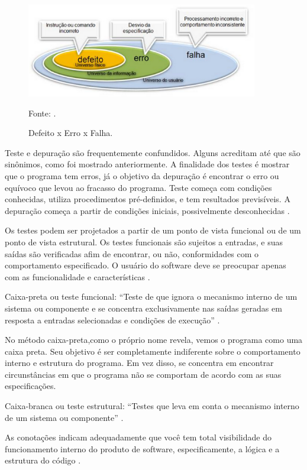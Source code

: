 \begin{figure}[H]
\centering
\includegraphics[width=0.9\textwidth]{figuras/defeitoErroFalha}
\caption{Defeito x Erro x Falha.}{Fonte:  .}
\label{defeitoErroFalha}
\end{figure}

Teste e depuração são frequentemente confundidos. Alguns acreditam até que são sinônimos, como foi mostrado anteriormente. A finalidade dos testes é mostrar que o programa tem erros, já o objetivo da depuração é encontrar o erro ou equívoco que levou ao fracasso do programa. Teste começa com condições conhecidas, utiliza procedimentos pré-definidos, e tem resultados previsíveis. A depuração começa a partir de condições iniciais, possivelmente desconhecidas \cite{beizer1990}.

Os testes podem ser projetados a partir de um ponto de vista funcional ou de um ponto de vista estrutural. Os testes funcionais são sujeitos a entradas, e suas saídas são verificadas afim de encontrar, ou não, conformidades com o comportamento especificado. O usuário do software deve se preocupar apenas com as funcionalidade e características \cite{beizer1990}.

Caixa-preta ou teste funcional:  “Teste de que ignora o mecanismo interno de um sistema ou componente e se concentra exclusivamente nas saídas geradas em resposta a entradas selecionadas e condições de execução” \cite{ieee}.

No método caixa-preta,como o próprio nome revela, vemos o programa como uma caixa preta. Seu objetivo é ser completamente indiferente sobre o comportamento interno e estrutura do programa. Em vez disso, se concentra em encontrar circunstâncias em que o programa não se comportam de acordo com as suas especificações\cite[pág.~13]{myers2004}.

Caixa-branca ou teste estrutural: “Testes que leva em conta o mecanismo interno de um sistema ou componente” \cite{ieee}.

 As conotações indicam adequadamente que você tem total visibilidade do funcionamento interno do produto de software, especificamente, a lógica e a estrutura do código \cite[pág.~1]{williams2006}.

